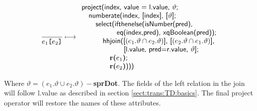 \begin{equation}
\frac{}{e_1\mbox{\texttt{[}}e_2\mbox{\texttt{]}}}\longmapsto
\begin{array}{l}
\mbox{\textsf{project(index, value = l.value, }}\vartheta\mbox{\textsf{;}} \\ \quad
\mbox{\textsf{numberate(index, [index], [}}\vartheta\mbox{\textsf{];}} \\ \quad\quad
\mbox{\textsf{select(ifthenelse(isNumber(pred),}} \\\quad\quad\quad\quad\quad
\mbox{\textsf{eq(index,pred), xqBoolean(pred));}} \\\quad\quad\quad
\mbox{\textsf{hhjoin([}}(e_1.\vartheta\cap e_2.\vartheta)\mbox{\textsf{], [}}(e_2.\vartheta\cap e_1.\vartheta)\mbox{\textsf{],}} 
\\ \quad\quad\quad \quad \quad \quad\mbox{\textsf{[l.value, pred=r.value, }}\vartheta\mbox{\textsf{];}}
\\\quad\quad\quad\quad
 \mbox{\textbf{r(}}e_1\mbox{\textbf{)}\textsf{;}} \\\quad\quad\quad\quad
\mbox{\textbf{r(}}e_2\mbox{\textbf{)}\textsf{)))}} \\
\end{array}
\label{rule:trans:TD:predicate}
\end{equation}

Where $\vartheta=(e_1.\vartheta \cup e_2.\vartheta)-$\textbf{sprDot}. The fields of the left relation in the join
will follow \textsf{l.value} as described in section \ref{sect:trans:TD:basics}. The final \textsf{project}
operator will restore the names of these attributes.

